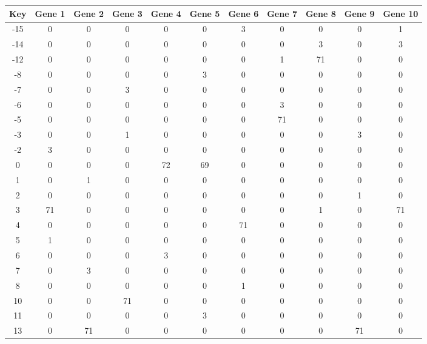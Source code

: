 \begin{tabular}{|c|c|c|c|c|c|c|c|c|c|c|}
\hline
Key & Gene 1 & Gene 2 & Gene 3 & Gene 4 & Gene 5 & Gene 6 & Gene 7 & Gene 8 & Gene 9 & Gene 10 \\
\hline
-15 & 0 & 0 & 0 & 0 & 0 & 3 & 0 & 0 & 0 & 1 \\
-14 & 0 & 0 & 0 & 0 & 0 & 0 & 0 & 3 & 0 & 3 \\
-12 & 0 & 0 & 0 & 0 & 0 & 0 & 1 & 71 & 0 & 0 \\
-8 & 0 & 0 & 0 & 0 & 3 & 0 & 0 & 0 & 0 & 0 \\
-7 & 0 & 0 & 3 & 0 & 0 & 0 & 0 & 0 & 0 & 0 \\
-6 & 0 & 0 & 0 & 0 & 0 & 0 & 3 & 0 & 0 & 0 \\
-5 & 0 & 0 & 0 & 0 & 0 & 0 & 71 & 0 & 0 & 0 \\
-3 & 0 & 0 & 1 & 0 & 0 & 0 & 0 & 0 & 3 & 0 \\
-2 & 3 & 0 & 0 & 0 & 0 & 0 & 0 & 0 & 0 & 0 \\
0 & 0 & 0 & 0 & 72 & 69 & 0 & 0 & 0 & 0 & 0 \\
1 & 0 & 1 & 0 & 0 & 0 & 0 & 0 & 0 & 0 & 0 \\
2 & 0 & 0 & 0 & 0 & 0 & 0 & 0 & 0 & 1 & 0 \\
3 & 71 & 0 & 0 & 0 & 0 & 0 & 0 & 1 & 0 & 71 \\
4 & 0 & 0 & 0 & 0 & 0 & 71 & 0 & 0 & 0 & 0 \\
5 & 1 & 0 & 0 & 0 & 0 & 0 & 0 & 0 & 0 & 0 \\
6 & 0 & 0 & 0 & 3 & 0 & 0 & 0 & 0 & 0 & 0 \\
7 & 0 & 3 & 0 & 0 & 0 & 0 & 0 & 0 & 0 & 0 \\
8 & 0 & 0 & 0 & 0 & 0 & 1 & 0 & 0 & 0 & 0 \\
10 & 0 & 0 & 71 & 0 & 0 & 0 & 0 & 0 & 0 & 0 \\
11 & 0 & 0 & 0 & 0 & 3 & 0 & 0 & 0 & 0 & 0 \\
13 & 0 & 71 & 0 & 0 & 0 & 0 & 0 & 0 & 71 & 0 \\
\hline
\end{tabular}